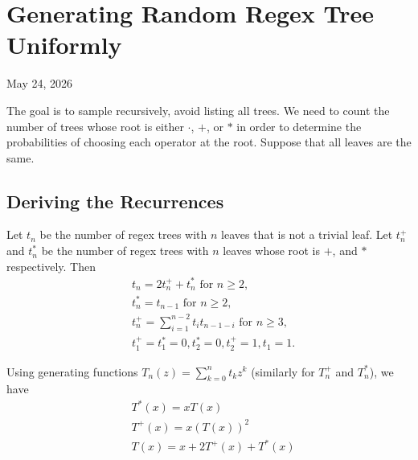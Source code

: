\chapter{Generating Random Regex Tree Uniformly}

\begin{center}
  May 24, 2026
  \vspace{0.5cm}
\end{center}

The goal is to sample recursively, avoid listing all trees. We need to count the number of trees whose root is either $\cdot$, $+$, or $*$ in order to determine the probabilities of choosing each operator at the root. Suppose that all leaves are the same.

\section{Deriving the Recurrences}

Let $t_n$ be the number of regex trees with $n$ leaves that is not a trivial leaf. Let $t_n^+$ and $t_n^*$ be the number of regex trees with $n$ leaves whose root is $+$, and $*$ respectively. Then
\begin{align}
   & t_n = 2t_n^+ + t_n^* \text{ for } n\ge 2,                     \\
   & t_{n}^* = t_{n-1} \text{ for } n\ge 2,                        \\
   & t_{n}^+ = \sum_{i=1}^{n-2} t_i t_{n-1-i} \text{ for } n\ge 3, \\
   & t_1^+ = t_1^* = 0, t_2^*=0, t_2^+=1, t_1=1.
\end{align}

Using generating functions $T_n(z)=\sum_{k=0}^n t_k z^k$ (similarly for $T_n^+$ and $T_n^*$), we have
\begin{align*}
   & T^*(x) = xT(x)              \\
   & T^+(x) = x(T(x))^2          \\
   & T(x) = x + 2T^+(x) + T^*(x)
\end{align*}

